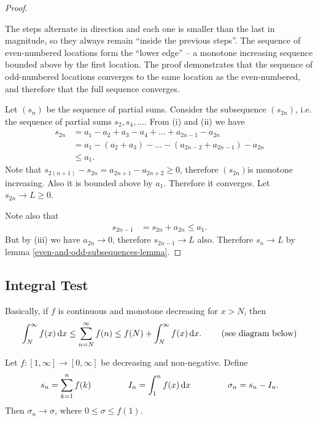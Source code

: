 \begin{proof}
  \begin{intuition*}
    The steps alternate in direction and each one is smaller than the last in magnitude, so they
    always remain ``inside the previous steps''. The sequence of even-numbered locations form the
    ``lower edge'' -- a monotone increasing sequence bounded above by the first location. The proof
    demonstrates that the sequence of odd-numbered locations converges to the same location as the
    even-numbered, and therefore that the full sequence converges.
  \end{intuition*}

  Let $(s_n)$ be the sequence of partial sums. Consider the subsequence $(s_{2n})$, i.e. the
  sequence of partial sums $s_2, s_4, \ldots$. From (i) and (ii) we have
  \begin{align*}
    s_{2n}   &= a_1 - a_2 + a_3 - a_4 + \ldots + a_{2n - 1} - a_{2n}\\
             &= a_1 - (a_2 + a_3) - \ldots - (a_{2n - 2} + a_{2n - 1}) - a_{2n}\\
            &\leq a_1.
  \end{align*}
  Note that $s_{2(n+1)} - s_{2n} = a_{2n+1} - a_{2n + 2} \geq 0$, therefore $(s_{2n})$is monotone
  increasing. Also it is bounded above by $a_1$. Therefore it converges. Let $s_{2n} \to L \geq 0$.

  Note also that
  \begin{align*}
    s_{2n-1} &= s_{2n} + a_{2n} \leq a_1.
  \end{align*}
  But by (iii) we have $a_{2n} \to 0$, therefore $s_{2n-1} \to L$ also. Therefore $s_n \to L$ by lemma \ref{even-and-odd-subsequences-lemma}.
\end{proof}


\subsection{Integral Test}

\begin{intuition*}
  Basically, if $f$ is continuous and monotone decreasing for $x > N$, then
  \begin{align*}
    \int_N^\infty f(x) \dx \leq \sum_{n=N}^\infty f(n) \leq f(N) + \int_N^\infty f(x) \dx. ~~~~~~~\text{(see diagram below)}
  \end{align*}
\end{intuition*}

\begin{theorem*}
  Let $f:[1,\infty] \to [0, \infty]$ be decreasing and non-negative. Define
  \begin{align*}
    s_n = \sum_{k=1}^nf(k) ~~~~~~~~~~~~~ I_n = \int_1^n f(x) \dx ~~~~~~~~~~~~~ \sigma_n = s_n - I_n.
  \end{align*}
  Then $\sigma_n \to \sigma$, where $0 \leq \sigma \leq f(1)$.
\end{theorem*}

